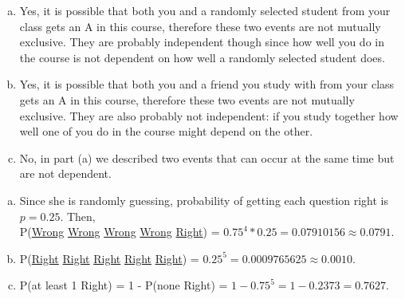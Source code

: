 {
\begin{enumerate}[(a)]
\item Yes, it is possible that both you and a randomly selected student from your class gets an A in this course, therefore these two events are not mutually exclusive. They are probably independent though since how well you do in the course is not dependent on how well a randomly selected student does.
\item Yes, it is possible that both you and a friend you study with from your class gets an A in this course, therefore these two events are not mutually exclusive. They are also probably not independent: if you study together how well one of you do in the course might depend on the other.
\item No, in part (a) we described two events that can occur at the same time but are not dependent.
\end{enumerate}
}


{
\begin{enumerate}[(a)]
\item Since she is randomly guessing, probability of getting each question right is $p = 0.25$. Then, \\
P(\underline{Wrong} \underline{Wrong} \underline{Wrong} \underline{Wrong} \underline{Right}) = $0.75^4 * 0.25 = 0.07910156 \approx 0.0791$.
\item P(\underline{Right} \underline{Right} \underline{Right} \underline{Right} \underline{Right}) = $0.25^5 = 0.0009765625 \approx 0.0010$.
\item P(at least 1 Right) = 1 - P(none Right) = $1 - 0.75^5 = 1 - 0.2373 = 0.7627$.
\end{enumerate}
}

